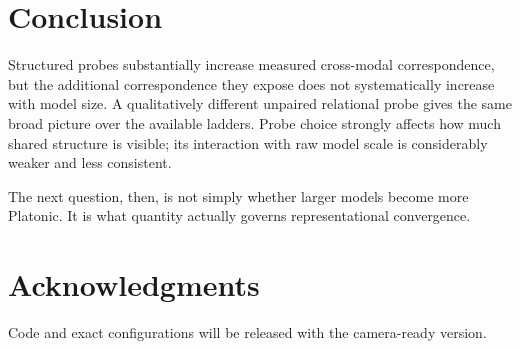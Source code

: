 \documentclass[11pt]{article}
\begin{document}
\section{Conclusion}
\label{sec:conc}

Structured probes substantially increase measured cross-modal correspondence, but the additional correspondence they expose does not systematically increase with model size.
A qualitatively different unpaired relational probe gives the same broad picture over the available ladders.
Probe choice strongly affects how much shared structure is visible; its interaction with raw model scale is considerably weaker and less consistent.

The next question, then, is not simply whether larger models become more Platonic.
It is what quantity actually governs representational convergence.

\section*{Acknowledgments}
Code and exact configurations will be released with the camera-ready version.



\end{document}
